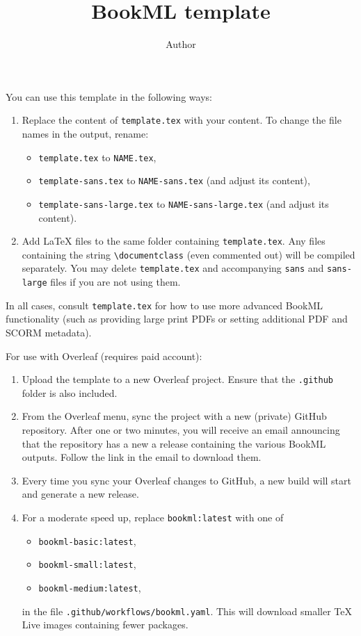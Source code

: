 \documentclass[oneside,11pt]{amsart}
\title{BookML template}
\author{Author}
\begin{document}
\maketitle

You can use this template in the following ways:
\begin{enumerate}
  \item Replace the content of \texttt{template.tex} with your content. To change the file names in the output, rename:
  \begin{itemize}
      \item \texttt{template.tex} to \texttt{NAME.tex},
      \item \texttt{template-sans.tex} to \texttt{NAME-sans.tex} (and adjust its content),
      \item \texttt{template-sans-large.tex} to \texttt{NAME-sans-large.tex} (and adjust its content).
  \end{itemize}
  \item Add \LaTeX{} files to the same folder containing \texttt{template.tex}. Any files containing the string \verb|\documentclass| (even commented out) will be compiled separately. You may delete \texttt{template.tex} and accompanying \texttt{sans} and \texttt{sans-large} files if you are not using them.
\end{enumerate}
In all cases, consult \texttt{template.tex} for how to use more advanced BookML functionality (such as providing large print PDFs or setting additional PDF and SCORM metadata).

\bigskip

For use with Overleaf (requires paid account):
\begin{enumerate}
  \item Upload the template to a new Overleaf project. Ensure that the \texttt{.github} folder is also included.
  \item From the Overleaf menu, sync the project with a new (private) GitHub repository. After one or two minutes, you will receive an email announcing that the repository has a new a release containing the various BookML outputs. Follow the link in the email to download them.
  \item Every time you sync your Overleaf changes to GitHub, a new build will start and generate a new release.
  \item For a moderate speed up, replace \texttt{bookml:latest} with one of
  \begin{itemize}
      \item \texttt{bookml-basic:latest},
      \item \texttt{bookml-small:latest},
      \item \texttt{bookml-medium:latest},
  \end{itemize}
  in the file \texttt{.github/workflows/bookml.yaml}. This will download smaller \TeX{} Live images containing fewer packages.
\end{enumerate}
\end{document}
